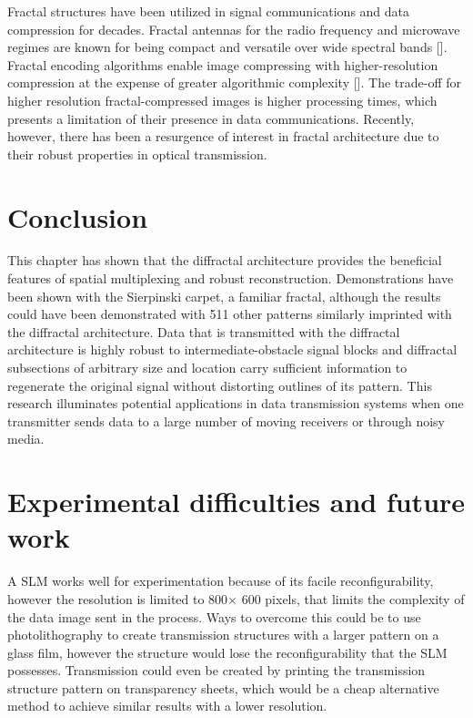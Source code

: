 
Fractal structures have been utilized in signal communications and data compression for decades. Fractal antennas for the radio frequency and microwave regimes are known for being compact and versatile over wide spectral bands [\cite{Radonic,Puente-Baliarda}]. Fractal encoding algorithms enable image compressing with higher-resolution compression at the expense of greater algorithmic complexity [\cite{Jacquin}]. The trade-off for higher resolution fractal-compressed images is higher processing times, which presents a limitation of their presence in data communications. Recently, however, there has been a resurgence of interest in fractal architecture due to their robust properties in optical transmission.

\section{Conclusion}
This chapter has shown that the diffractal architecture provides the beneficial features of spatial multiplexing and robust reconstruction. Demonstrations have been shown with the Sierpinski carpet, a familiar fractal, although the results could have been demonstrated with 511 other patterns similarly imprinted with the diffractal architecture. Data that is transmitted with the diffractal architecture is highly robust to intermediate-obstacle signal blocks and diffractal subsections of arbitrary size and location carry sufficient information to regenerate the original signal without distorting outlines of its pattern.  This research illuminates potential applications in data transmission systems when one transmitter sends data to a large number of moving receivers or through noisy media.

\section{Experimental difficulties and future work}
A SLM works well for experimentation because of its facile reconfigurability, however the resolution is limited to 800$\times$ 600 pixels, that limits the complexity of the data image sent in the process. Ways to overcome this could be to use photolithography to create transmission structures with a larger pattern on a glass film, however the structure would lose the reconfigurability that the SLM possesses. Transmission could even be created by printing the transmission structure pattern on transparency sheets, which would be a cheap alternative method to achieve similar results with a lower resolution.